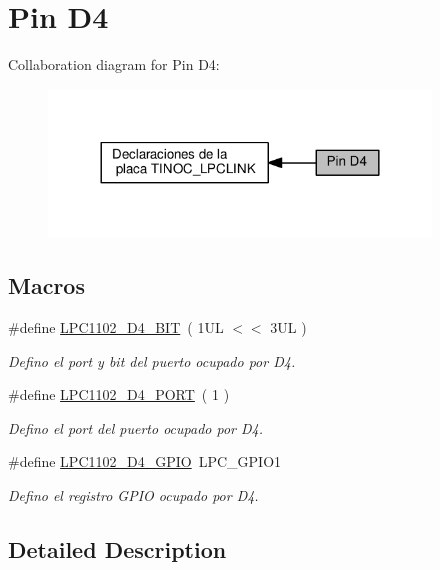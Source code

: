 \hypertarget{group___p_i_n_d4}{}\section{Pin D4}
\label{group___p_i_n_d4}
Collaboration diagram for Pin D4\+:\nopagebreak
\begin{figure}[H]
\begin{center}
\leavevmode
\includegraphics[width=288pt]{group___p_i_n_d4}
\end{center}
\end{figure}
\subsection*{Macros}
\begin{DoxyCompactItemize}
\item 
\#define \hyperlink{group___p_i_n_d4_ga9654c36aa00f501fb2cec682f6aa84c4}{L\+P\+C1102\+\_\+\+D4\+\_\+\+B\+IT}~( 1\+U\+L $<$$<$ 3\+U\+L )
\begin{DoxyCompactList}\small\item\em Defino el port y bit del puerto ocupado por D4. \end{DoxyCompactList}\item 
\#define \hyperlink{group___p_i_n_d4_ga58a788705aa9b7850deb5fa19cfd856c}{L\+P\+C1102\+\_\+\+D4\+\_\+\+P\+O\+RT}~( 1 )
\begin{DoxyCompactList}\small\item\em Defino el port del puerto ocupado por D4. \end{DoxyCompactList}\item 
\#define \hyperlink{group___p_i_n_d4_ga6ca2b1173d8c6e4ca72a10d780fdfd80}{L\+P\+C1102\+\_\+\+D4\+\_\+\+G\+P\+IO}~L\+P\+C\+\_\+\+G\+P\+I\+O1
\begin{DoxyCompactList}\small\item\em Defino el registro G\+P\+IO ocupado por D4. \end{DoxyCompactList}\end{DoxyCompactItemize}


\subsection{Detailed Description}


